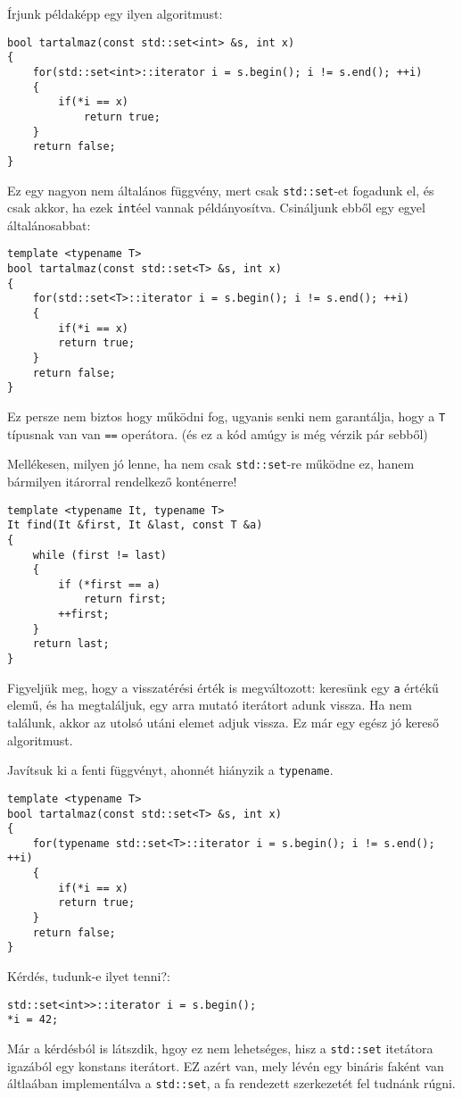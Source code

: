 \documentclass[a4paper,11.5pt]{article}
\begin{document}
	\smallskip
	Írjunk példaképp egy ilyen algoritmust:
	\begin{lstlisting}
bool tartalmaz(const std::set<int> &s, int x)
{
	for(std::set<int>::iterator i = s.begin(); i != s.end(); ++i)
	{
		if(*i == x)
			return true;
	}
	return false;
}
	\end{lstlisting}
	
	Ez egy nagyon nem általános függvény, mert csak \texttt{std::set}-et fogadunk el, és csak akkor, ha ezek \texttt{int}éel vannak példányosítva. Csináljunk ebből egy egyel általánosabbat:
\begin{lstlisting}
template <typename T>
bool tartalmaz(const std::set<T> &s, int x)
{
	for(std::set<T>::iterator i = s.begin(); i != s.end(); ++i)
	{
		if(*i == x)
		return true;
	}
	return false;
}
\end{lstlisting}
	Ez persze nem biztos hogy működni fog, ugyanis senki nem garantálja, hogy a \texttt{T} típusnak van van \texttt{==} operátora. (és ez a kód amúgy is még vérzik pár sebből)
	
	\medskip
	Mellékesen, milyen jó lenne, ha nem csak \texttt{std::set}-re működne ez, hanem bármilyen itárorral rendelkező konténerre!
\begin{lstlisting}
template <typename It, typename T>
It find(It &first, It &last, const T &a)
{
	while (first != last)
	{
		if (*first == a)
			return first;
		++first;
	}
	return last;
}
\end{lstlisting}
	Figyeljük meg, hogy a visszatérési érték is megváltozott: keresünk egy \texttt{a} értékű elemű, és ha megtaláljuk, egy arra mutató iterátort adunk vissza. Ha nem találunk, akkor az utolsó utáni elemet adjuk vissza. Ez már egy egész jó kereső algoritmust.
	
	\medskip
	Javítsuk ki a fenti függvényt, ahonnét hiányzik a \texttt{typename}.
\begin{lstlisting}
template <typename T>
bool tartalmaz(const std::set<T> &s, int x)
{
	for(typename std::set<T>::iterator i = s.begin(); i != s.end(); ++i)
	{
		if(*i == x)
		return true;
	}
	return false;
}
\end{lstlisting}
	
	\medskip
	Kérdés, tudunk-e ilyet tenni?:
\begin{lstlisting}
std::set<int>>::iterator i = s.begin();
*i = 42;
\end{lstlisting}
	Már a kérdésból is látszdik, hgoy ez nem lehetséges, hisz a \texttt{std::set} itetátora igazából egy konstans iterátort. EZ azért van, mely lévén egy bináris faként van áltlaában implementálva a \texttt{std::set}, a fa rendezett szerkezetét fel tudnánk rúgni.
	
\end{document}
